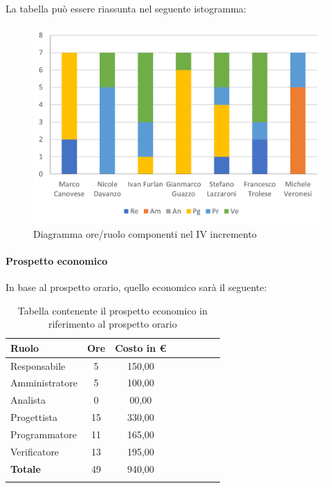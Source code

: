 La tabella può essere riassunta nel seguente istogramma:

\begin{figure}[H]
	\centering
	\includegraphics[width=0.8\linewidth]{res/images/preventivo/dettaglio_implementazione/1-1.png}
	\caption{Diagramma ore/ruolo componenti nel IV incremento}
	\label{fig:diagramma suddivisione ruoli IV incremento}
\end{figure}

\paragraph{Prospetto economico}
In base al prospetto orario, quello economico sarà il seguente:

\begin{longtable}{|l|c|c|c|c|c|c|c|}
	\hline
	\rowcolor{lighter-grayer}
	\textbf{Ruolo}  & \textbf{Ore} & \textbf{Costo in €} \\
	\hline
	\endfirsthead

	\hline
	Responsabile    & 5            & 150,00              \\
	\hline
	\hline
	Amministratore  & 5           & 100,00              \\
	\hline
	\hline
	Analista        & 0           & 00,00              \\
	\hline
	\hline
	Progettista     & 15            & 330,00                   \\
	\hline
	\hline
	Programmatore   & 11            & 165,00                   \\
	\hline
	\hline
	Verificatore    & 13            & 195,00                   \\
	\hline
	\textbf{Totale} & 49           & 940,00            \\
	\hline
	\rowcolor{white}
	\caption{Tabella contenente il prospetto economico in riferimento al prospetto orario}
\end{longtable}
\pagebreak


